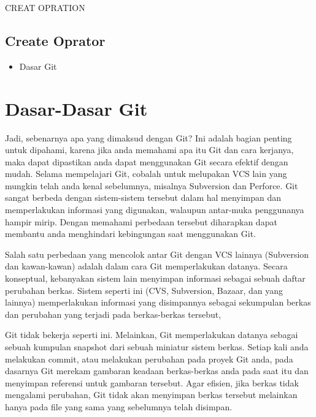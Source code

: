 
\sloppy
{\fontsize{14pt}{14pt}\selectfont CREAT OPRATION \\} \par

\subsection{Create Oprator}

\vspace{\baselineskip}
\begin{itemize}
	\item Dasar Git
\end{itemize}

\vspace{\baselineskip}
\noindent 
{\fontsize{14pt}{14pt}\section{Dasar-Dasar Git}
	\vspace{\baselineskip}
	\noindent 
	{\fontsize{14pt}{14pt}\selectfont
	 Jadi, sebenarnya apa yang dimaksud dengan Git? Ini adalah bagian penting untuk dipahami, karena jika anda memahami apa itu Git dan cara kerjanya, maka dapat dipastikan anda dapat menggunakan Git secara efektif dengan mudah. Selama mempelajari Git, cobalah untuk melupakan VCS lain yang mungkin telah anda kenal sebelumnya, misalnya Subversion dan Perforce. Git sangat berbeda dengan sistem-sistem tersebut dalam hal menyimpan dan memperlakukan informasi yang digunakan, walaupun antar-muka penggunanya hampir mirip. Dengan memahami perbedaan tersebut diharapkan dapat membantu anda menghindari kebingungan saat menggunakan Git. \\} \par

\vspace{\baselineskip}
\noindent 
{\fontsize{14pt}{14pt}\selectfont Salah satu perbedaan yang mencolok antar Git dengan VCS lainnya (Subversion dan kawan-kawan) adalah dalam cara Git memperlakukan datanya. Secara konseptual, kebanyakan sistem lain menyimpan informasi sebagai sebuah daftar perubahan berkas. Sistem seperti ini (CVS, Subversion, Bazaar, dan yang lainnya) memperlakukan informasi yang disimpannya sebagai sekumpulan berkas dan perubahan yang terjadi pada berkas-berkas tersebut, \\} \par

\vspace{\baselineskip}
\vspace{14pt}
\noindent 
{\fontsize{14pt}{14pt}\selectfont Git tidak bekerja seperti ini. Melainkan, Git memperlakukan datanya sebagai sebuah kumpulan snapshot dari sebuah miniatur sistem berkas. Setiap kali anda melakukan commit, atau melakukan perubahan pada proyek Git anda, pada dasarnya Git merekam gambaran keadaan berkas-berkas anda pada saat itu dan menyimpan referensi untuk gambaran tersebut. Agar efisien, jika berkas tidak mengalami perubahan, Git tidak akan menyimpan berkas tersebut melainkan hanya pada file yang sama yang sebelumnya telah disimpan. \\} \par

}
